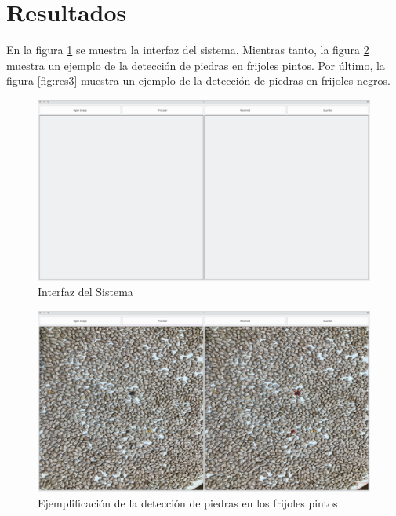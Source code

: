 \documentclass[conference]{IEEEtran}
\begin{document}
\section{Resultados}
    En la figura \ref{fig:res1} se muestra la interfaz del sistema. Mientras tanto, la figura \ref{fig:res2} muestra un ejemplo de la detección de piedras en frijoles pintos. Por último, la figura \ref{fig:res3} muestra un ejemplo de la detección de piedras en frijoles negros.

    \begin{figure}[H]
        \centering
        \includegraphics[width=\breite\linewidth]{images/UI.png}
        \caption{Interfaz del Sistema}
        \label{fig:res1}
    \end{figure}

    \begin{figure}[H]
        \centering
        \includegraphics[width=\breite\linewidth]{images/pintos.png}
        \caption{Ejemplificación de la detección de piedras en los frijoles pintos}
        \label{fig:res2}
    \end{figure}
\end{document}
